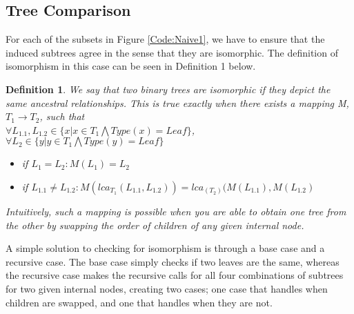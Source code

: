 \subsection{Tree Comparison}
For each of the subsets in Figure \ref{Code:Naive1}, we have to ensure that the induced subtrees agree in the sense that they are isomorphic. The definition of isomorphism in this case can be seen in Definition 1 below.

\newtheorem{definition}{Definition}
\begin{definition}
	We say that two binary trees are isomorphic if they depict the same ancestral relationships. This is true exactly when there exists a mapping M, $T_1 \rightarrow T_2$, such that \\
	$\forall L_{1.1}, L_{1.2} \in \{ x | x \in T_1 \bigwedge Type(x)=Leaf \}$, \\ $\forall L_2 \in \{ y | y \in T_1 \bigwedge Type(y)=Leaf \}$
	\begin{itemize}
		\item if $L_1 = L_2 : M(L_1)=L_2$
		
		\item if $L_{1.1} \neq L_{1.2} : M(lca_{T_1}(L_{1.1}, L_{1.2})) = lca_(T_2)(M(L_{1.1}), M(L_{1.2})$
	\end{itemize}
	Intuitively, such a mapping is possible when you are able to obtain one tree from the other by swapping the order of children of any given internal node.  
\end{definition}

A simple solution to checking for isomorphism is through a base case and a recursive case. The base case simply checks if two leaves are the same, whereas the recursive case makes the recursive calls for all four combinations of subtrees for two given internal nodes, creating two cases; one case that handles when children are swapped, and one that handles when they are not. 





